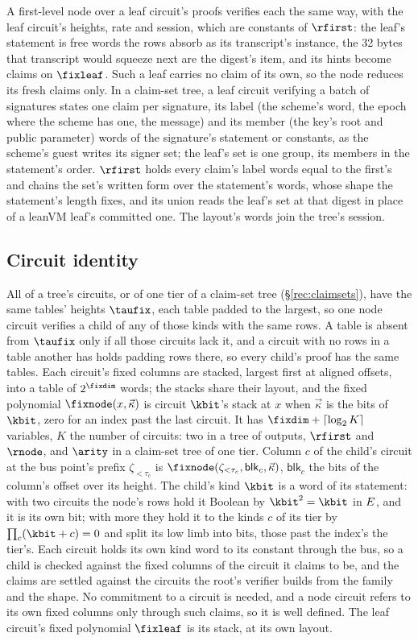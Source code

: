 A first-level node over a leaf circuit's proofs verifies each the same way, with the leaf circuit's heights, rate and session, which are constants of $\rfirst$: the leaf's statement is free words the rows absorb as its transcript's instance, the 32 bytes that transcript would squeeze next are the digest's item, and its hints become claims on $\fixleaf$. Such a leaf carries no claim of its own, so the node reduces its fresh claims only. In a claim-set tree, a leaf circuit verifying a batch of signatures states one claim per signature, its label (the scheme's word, the epoch where the scheme has one, the message) and its member (the key's root and public parameter) words of the signature's statement or constants, as the scheme's guest writes its signer set; the leaf's set is one group, its members in the statement's order. $\rfirst$ holds every claim's label words equal to the first's and chains the set's written form over the statement's words, whose shape the statement's length fixes, and its union reads the leaf's set at that digest in place of a leanVM leaf's committed one. The layout's words join the tree's session.

\subsection{Circuit identity}\label{rec:identity}

All of a tree's circuits, or of one tier of a claim-set tree (\S\ref{rec:claimsets}), have the same tables' heights $\taufix$, each table padded to the largest, so one node circuit verifies a child of any of those kinds with the same rows. A table is absent from $\taufix$ only if all those circuits lack it, and a circuit with no rows in a table another has holds padding rows there, so every child's proof has the same tables. Each circuit's fixed columns are stacked, largest first at aligned offsets, into a table of $2^{\fixdim}$ words; the stacks share their layout, and the fixed polynomial $\fixnode(x,\vec\kappa)$ is circuit $\kbit$'s stack at $x$ when $\vec\kappa$ is the bits of $\kbit$, zero for an index past the last circuit. It has $\fixdim+\lceil\log_2 K\rceil$ variables, $K$ the number of circuits: two in a tree of outputs, $\rfirst$ and $\rnode$, and $\arity$ in a claim-set tree of one tier. Column $c$ of the child's circuit at the bus point's prefix $\zeta_{<\tau_c}$ is $\fixnode(\zeta_{<\tau_c},\mathsf{blk}_c,\vec\kappa)$, $\mathsf{blk}_c$ the bits of the column's offset over its height. The child's kind $\kbit$ is a word of its statement: with two circuits the node's rows hold it Boolean by $\kbit^2=\kbit$ in $E$, and it is its own bit; with more they hold it to the kinds $c$ of its tier by $\prod_c(\kbit+c)=0$ and split its low limb into bits, those past the index's the tier's. Each circuit holds its own kind word to its constant through the bus, so a child is checked against the fixed columns of the circuit it claims to be, and the claims are settled against the circuits the root's verifier builds from the family and the shape. No commitment to a circuit is needed, and a node circuit refers to its own fixed columns only through such claims, so it is well defined. The leaf circuit's fixed polynomial $\fixleaf$ is its stack, at its own layout.

